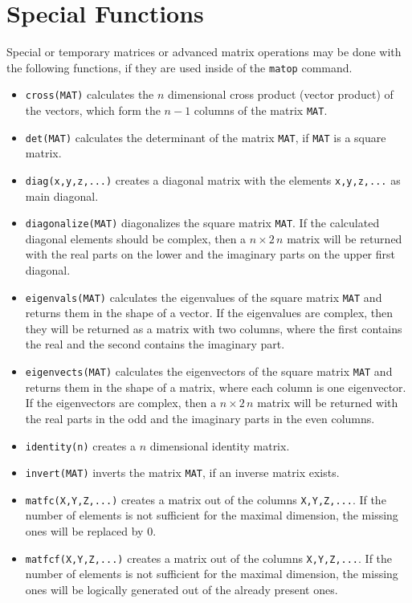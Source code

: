 \documentclass[DIV=14,headsepline,footsepline]{scrbook}
\begin{document}
			\section{Special Functions}
				Special or temporary matrices or advanced matrix operations may be done with the following functions, if they are used inside of the \verb+matop+ command.
				\begin{itemize}
					\item \verb+cross(MAT)+ calculates the $n$ dimensional cross product (vector product) of the vectors, which form the $n-1$ columns of the matrix \verb+MAT+.
					\item \verb+det(MAT)+ calculates the determinant of the matrix \verb+MAT+, if \verb+MAT+ is a square matrix.
					\item \verb+diag(x,y,z,...)+ creates a diagonal matrix with the elements \verb+x,y,z,...+ as main diagonal.
					\item \verb+diagonalize(MAT)+ diagonalizes the square matrix \verb+MAT+. If the calculated diagonal elements should be complex, then a $n \times 2\,n$ matrix will be returned with the real parts on the lower and the imaginary parts on the upper first diagonal.
					\item \verb+eigenvals(MAT)+ calculates the eigenvalues of the square matrix \verb+MAT+ and returns them in the shape of a vector. If the eigenvalues are complex, then they will be returned as a matrix with two columns, where the first contains the real and the second contains the imaginary part.
					\item \verb+eigenvects(MAT)+ calculates the eigenvectors of the square matrix \verb+MAT+ and returns them in the shape of a matrix, where each column is one eigenvector. If the eigenvectors are complex, then a $n \times 2\,n$ matrix will be returned with the real parts in the odd and the imaginary parts in the even columns.
					\item \verb+identity(n)+ creates a $n$ dimensional identity matrix.
					\item \verb+invert(MAT)+ inverts the matrix \verb+MAT+, if an inverse matrix exists.
					\item \verb+matfc(X,Y,Z,...)+ creates a matrix out of the columns \verb+X,Y,Z,...+. If the number of elements is not sufficient for the maximal dimension, the missing ones will be replaced by 0.
					\item \verb+matfcf(X,Y,Z,...)+ creates a matrix out of the columns \verb+X,Y,Z,...+. If the number of elements is not sufficient for the maximal dimension, the missing ones will be logically generated out of the already present ones.

\end{itemize}
\end{document}
